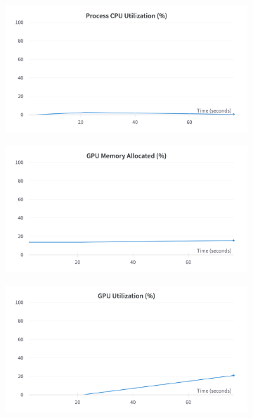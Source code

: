 \begin{figure}[H]
	\centering
	\begin{subfigure}{0.32\textwidth}
		\centering
		\includegraphics[width=\textwidth]{chapters/3_models/imgs/ufnc/ufcncpusage.png}
	\end{subfigure}
	\begin{subfigure}{0.32\textwidth}
		\centering
		\includegraphics[width=\textwidth]{chapters/3_models/imgs/ufnc/ufcnmem.png}
	\end{subfigure}
	\begin{subfigure}{0.32\textwidth}
		\centering
		\includegraphics[width=\textwidth]{chapters/3_models/imgs/ufnc/ufcnusagevera.png}

\end{subfigure}
\end{figure}

